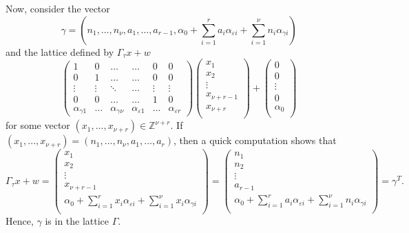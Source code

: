 Now, consider the vector 
\[\gamma = (n_1, \dots, n_{\nu}, a_1, \dots, a_{r-1}, \alpha_0+\sum_{i = 1}^r a_i \alpha_{\varepsilon i} + \sum_{i = 1}^{\nu} n_i \alpha_{\gamma i})\]
and the lattice defined by $\Gamma_{\tau}x + w$
\[\begin{pmatrix}
	1 & 0 & \dots &  \dots & 0 & 0\\ 
	0 & 1	& \dots & \dots & 0 & 0\\
	\vdots & \vdots & \ddots & \dots & \vdots & \vdots \\ 
	0 & 0 & \dots &  \dots & 1 & 0\\ 
	\alpha_{\gamma 1} & \dots &\alpha_{\gamma {\nu}} & \alpha_{\varepsilon 1} & \dots & \alpha_{\varepsilon {r}}
\end{pmatrix}
\begin{pmatrix}
	x_1 \\ x_2 \\ \vdots \\ x_{\nu+r - 1} \\ x_{\nu+r}\\ 
\end{pmatrix}+
\begin{pmatrix}
	0 \\ 0 \\ \vdots \\ 0 \\ \alpha_0\\ 
\end{pmatrix}\]
for some vector $(x_1, \dots, x_{\nu+r}) \in \mathbb{Z}^{\nu+r}$.
If  $(x_1, \dots, x_{\nu+r}) = (n_1, \dots, n_{\nu}, a_1, \dots, a_{r})$, then a quick computation shows that 
\[\Gamma_{\tau}x + w = 
\begin{pmatrix}
	x_1 \\ x_2 \\ \vdots \\ x_{\nu+r - 1} \\ \alpha_0+\sum_{i = 1}^r x_i \alpha_{\varepsilon i} + \sum_{i = 1}^{\nu} x_i \alpha_{\gamma i}\\ 
\end{pmatrix} = 
\begin{pmatrix}
	n_1 \\ n_2 \\ \vdots \\ a_{r - 1} \\ \alpha_0+\sum_{i = 1}^r a_i \alpha_{\varepsilon i} + \sum_{i = 1}^{\nu} n_i \alpha_{\gamma i}\\ 
\end{pmatrix} = \gamma^T.\]
Hence, $\gamma$ is in the lattice $\Gamma$.

